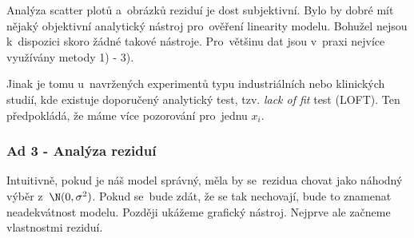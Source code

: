 \begin{example}
	Analýza scatter plotů a~obrázků reziduí je dost subjektivní. Bylo by dobré mít nějaký objektivní analytický nástroj pro~ověření linearity modelu. Bohužel nejsou k~dispozici skoro žádné takové nástroje. Pro~většinu dat jsou v~praxi nejvíce využívány metody 1) - 3).
	
	Jinak je tomu u~navržených experimentů typu industriálních nebo klinických studií, kde existuje doporučený analytický test, tzv. \textit{lack of fit} test (LOFT). Ten předpokládá, že máme více pozorování pro~jednu $x_i$.
\end{example}

\subsubsection*{Ad 3 - Analýza reziduí}
Intuitivně, pokud je náš model správný, měla by se~rezidua chovat jako náhodný výběr z~$\N(0,\sigma^2)$. Pokud se~bude zdát, že se tak nechovají, bude to znamenat neadekvátnost modelu. Později ukážeme grafický nástroj. Nejprve ale začneme vlastnostmi reziduí.